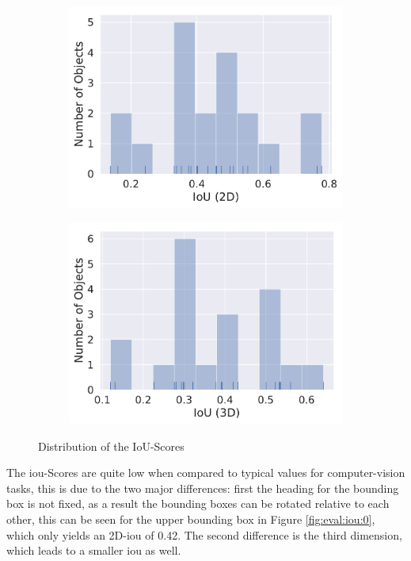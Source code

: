 \begin{figure}[h!]
    \centering
    \begin{subfigure}[c]{0.49\textwidth}
        \includegraphics[width=\textwidth]{../Material/iouDist2.pdf}
    \end{subfigure}
    \begin{subfigure}[c]{0.49\textwidth}
        \includegraphics[width=\textwidth]{../Material/iouDist3.pdf}
    \end{subfigure}
    \caption{Distribution of the IoU-Scores}
    \label{fig:eval:iouDist}
\end{figure}

The \ac{iou}-Scores are quite low when compared to typical values for computer-vision tasks, this is due to the two major differences: first the heading for the bounding box is not fixed, as a result the bounding boxes can be rotated relative to each other, this can be seen for the upper bounding box in Figure \ref{fig:eval:iou:0}, which only yields an 2D-\ac{iou} of 0.42.
The second difference is the third dimension, which leads to a smaller \ac{iou} as well.

